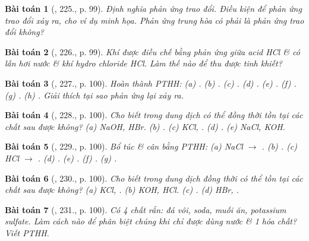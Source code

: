 \documentclass{article}
\newtheorem{baitoan}{Bài toán}
\begin{document}
\begin{baitoan}[\cite{Nguyen_Buu_Can_500_BT_Hoa_Hoc_THCS}, 225., p. 99]
	Định nghĩa phản ứng trao đổi. Điều kiện để phản ứng trao đổi xảy ra, cho ví dụ minh họa. Phản ứng trung hòa có phải là phản ứng trao đổi không?
\end{baitoan}

\begin{baitoan}[\cite{Nguyen_Buu_Can_500_BT_Hoa_Hoc_THCS}, 226., p. 99]
	Khí {\rm{}} được điều chế bằng phản ứng giữa acid {\rm HCl \& } có lẫn hơi nước \& khí hydro chloride {\rm HCl}. Làm thế nào để thu được {\rm{}} tinh khiết?
\end{baitoan}

\begin{baitoan}[\cite{Nguyen_Buu_Can_500_BT_Hoa_Hoc_THCS}, 227., p. 100]
	Hoàn thành {\rm PTHH}: {\rm(a) . (b) . (c) . (d) . (e) . (f) . (g) . (h) }. Giải thích tại sao phản ứng lại xảy ra.
\end{baitoan}

\begin{baitoan}[\cite{Nguyen_Buu_Can_500_BT_Hoa_Hoc_THCS}, 228., p. 100]
	Cho biết trong dung dịch có thể đồng thời tồn tại các chất sau được không? {\rm(a) NaOH, HBr. (b) . (c) KCl, . (d) . (e) NaCl, KOH}.
\end{baitoan}

\begin{baitoan}[\cite{Nguyen_Buu_Can_500_BT_Hoa_Hoc_THCS}, 229., p. 100]
	Bổ túc \& cân bằng {\rm PTHH}: {\rm(a) NaCl $\to$ . (b) . (c) HCl $\to$ . (d) . (e) . (f) . (g) }.
\end{baitoan}

\begin{baitoan}[\cite{Nguyen_Buu_Can_500_BT_Hoa_Hoc_THCS}, 230., p. 100]
	Cho biết trong dung dịch đồng thời có thể tồn tại các chất sau được không? {\rm(a) KCl, . (b) KOH, HCl. (c) . (d) HBr, }.
\end{baitoan}

\begin{baitoan}[\cite{Nguyen_Buu_Can_500_BT_Hoa_Hoc_THCS}, 231., p. 100]
	Có 4 chất rắn: đá vôi, soda, muối ăn, potassium sulfate. Làm cách nào để phân biệt chúng khi chỉ được dùng nước \& 1 hóa chất? Viết {\rm PTHH}.
\end{baitoan}
\end{document}

